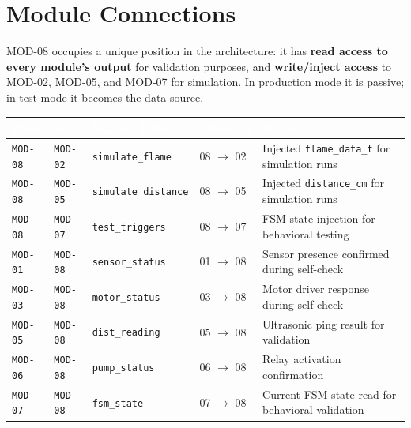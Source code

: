 \documentclass[a4paper,11pt]{article}
\newcommand{\theadtext}[1]{\textcolor{white}{\textbf{#1}}}
\begin{document}
\section{Module Connections}

MOD-08 occupies a unique position in the architecture: it has \textbf{read access to every
module's output} for validation purposes, and \textbf{write/inject access} to MOD-02,
MOD-05, and MOD-07 for simulation. In production mode it is passive; in test mode it
becomes the data source.

\vspace{6pt}
\begin{tabular}{L{1.87cm} L{1.87cm} L{3.74cm} L{2.72cm} L{6.8cm}}
\toprule
{}
\theadtext{From} & \theadtext{To} & \theadtext{Signal / Data} & \theadtext{Direction} & \theadtext{Notes} \\
\midrule
{}   \texttt{MOD-08} & \texttt{MOD-02} & \texttt{simulate\_flame}    & 08 $\rightarrow$ 02 & Injected \texttt{flame\_data\_t} for simulation runs \\
 \texttt{MOD-08} & \texttt{MOD-05} & \texttt{simulate\_distance} & 08 $\rightarrow$ 05 & Injected \texttt{distance\_cm} for simulation runs \\
   \texttt{MOD-08} & \texttt{MOD-07} & \texttt{test\_triggers}     & 08 $\rightarrow$ 07 & FSM state injection for behavioral testing \\
 \texttt{MOD-01} & \texttt{MOD-08} & \texttt{sensor\_status}     & 01 $\rightarrow$ 08 & Sensor presence confirmed during self-check \\
   \texttt{MOD-03} & \texttt{MOD-08} & \texttt{motor\_status}      & 03 $\rightarrow$ 08 & Motor driver response during self-check \\
 \texttt{MOD-05} & \texttt{MOD-08} & \texttt{dist\_reading}      & 05 $\rightarrow$ 08 & Ultrasonic ping result for validation \\
   \texttt{MOD-06} & \texttt{MOD-08} & \texttt{pump\_status}       & 06 $\rightarrow$ 08 & Relay activation confirmation \\
 \texttt{MOD-07} & \texttt{MOD-08} & \texttt{fsm\_state}         & 07 $\rightarrow$ 08 & Current FSM state read for behavioral validation \\
\bottomrule
\end{tabular}
\end{document}
